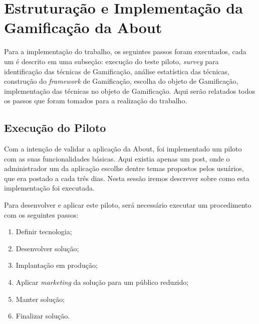 \chapter[Estruturação e Implementação da Gamificação da About]{Estruturação e Implementação da Gamificação da About}

Para a implementação do trabalho, os seguintes
passos foram executados, cada um é
descrito em uma subseção: execução do teste piloto, \textit{survey} para identificação das técnicas de Gamificação,
análise estatística das técnicas, construção do \textit{framework} de Gamificação, escolha do objeto de Gamificação,
implementação das técnicas no objeto de Gamificação.
Aqui serão relatados todos os passos que foram tomados para a realização do trabalho.




\section{Execução do Piloto}
\label{sec:execucao_do_piloto}
Com a intenção de validar a aplicação da About, foi implementado um piloto com as suas funcionalidades
básicas. Aqui existia apenas um post, onde o administrador um da aplicação escolhe dentre temas propostos
pelos usuários, que era postado a cada três dias.
Nesta sessão iremos descrever sobre como esta implementação foi executada.

Para desenvolver e aplicar este piloto, será necessário executar um procedimento
com os seguintes passos:

\begin{enumerate}
    \item Definir tecnologia;
    \item Desenvolver solução;
    \item Implantação em produção;
    \item Aplicar \textit{marketing} da solução para um público reduzido;
    \item Manter solução;
    \item Finalizar solução.
\end{enumerate}


